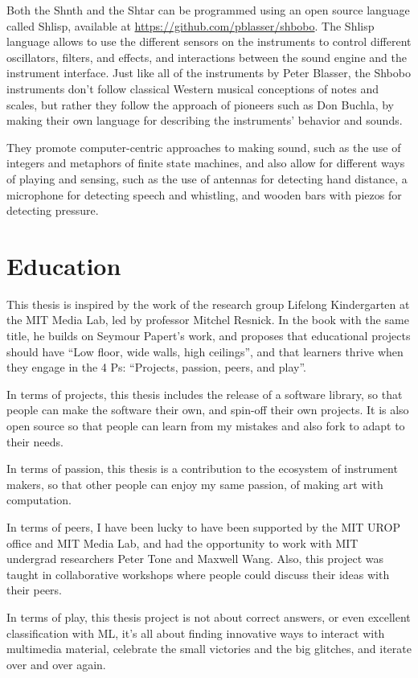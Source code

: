 Both the Shnth and the Shtar can be programmed using an open source language called Shlisp, available at \url{https://github.com/pblasser/shbobo}. The Shlisp language allows to use the different sensors on the instruments to control different oscillators, filters, and effects, and interactions between the sound engine and the instrument interface. Just like all of the instruments by Peter Blasser, the Shbobo instruments don't follow classical Western musical conceptions of notes and scales, but rather they follow the approach of pioneers such as Don Buchla, by making their own language for describing the instruments' behavior and sounds.

They promote computer-centric approaches to making sound, such as the use of integers and metaphors of finite state machines, and also allow for different ways of playing and sensing, such as the use of antennas for detecting hand distance, a microphone for detecting speech and whistling, and wooden bars with piezos for detecting pressure.

\section{Education}

This thesis is inspired by the work of the research group Lifelong Kindergarten at the MIT Media Lab, led by professor Mitchel Resnick. In the book with the same title, he builds on Seymour Papert’s work, and proposes that educational projects should have “Low floor, wide walls, high ceilings”, and that learners thrive when they engage in the 4 Ps: “Projects, passion, peers, and play”.

In terms of projects, this thesis includes the release of a software library, so that people can make the software their own, and spin-off their own projects. It is also open source so that people can learn from my mistakes and also \gls{fork} to adapt to their needs.

In terms of passion, this thesis is a contribution to the ecosystem of instrument makers, so that other people can enjoy my same passion, of making art with computation.

In terms of peers, I have been lucky to have been supported by the MIT UROP office and MIT Media Lab, and had the opportunity to work with MIT undergrad researchers Peter Tone and Maxwell Wang. Also, this project was taught in collaborative workshops where people could discuss their ideas with their peers.

In terms of play, this thesis project is not about correct answers, or even excellent classification with \acrshort{ML}, it's all about finding innovative ways to interact with multimedia material, celebrate the small victories and the big glitches, and iterate over and over again.

